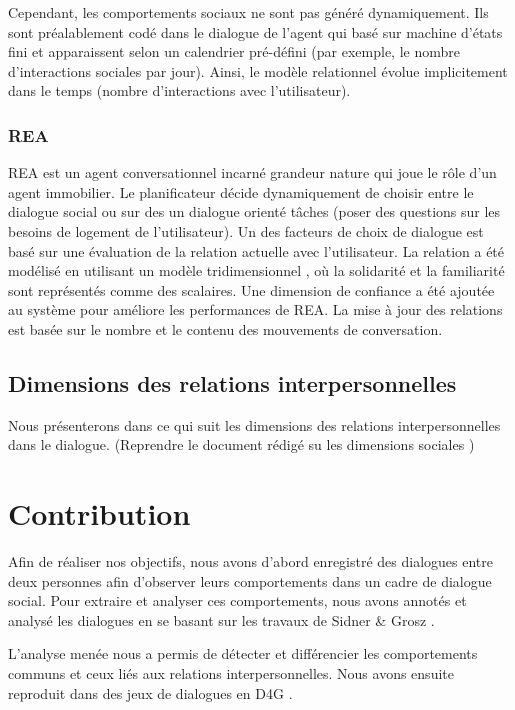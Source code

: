 \documentclass[a4paper,french]{article}
\begin{document}
\par Cependant, les comportements sociaux ne sont pas généré dynamiquement. Ils sont préalablement codé dans le dialogue de l'agent qui basé sur machine d'états fini et apparaissent selon un calendrier pré-défini (par exemple, le nombre d'interactions sociales par jour). Ainsi, le modèle relationnel évolue implicitement dans le temps (nombre d'interactions avec l'utilisateur).
\subsubsection{REA} REA \cite{bickmore2005establishing} est un agent conversationnel incarné grandeur nature qui joue le rôle d'un agent immobilier. Le planificateur décide dynamiquement  de choisir entre le dialogue social  ou sur des un dialogue orienté tâches (poser des questions sur les besoins de logement de l'utilisateur). Un des facteurs de choix de dialogue est basé sur une évaluation de la relation actuelle avec l'utilisateur. La relation a été modélisé en utilisant un modèle tridimensionnel \cite{svennevig2000getting}, où la solidarité et la familiarité sont représentés comme des scalaires. Une dimension de confiance a été ajoutée au système pour améliore les performances de REA. La  mise à jour des  relations est basée sur le nombre et le contenu des mouvements de conversation.



\subsection{ Dimensions des relations interpersonnelles}
Nous présenterons dans ce qui suit les dimensions des relations interpersonnelles dans le dialogue. 
(Reprendre le document rédigé su les dimensions sociales \cite {svennevig2000getting, haslam1994mental})


\section{Contribution}
\label{contribution}

\par Afin de réaliser nos objectifs, nous avons d'abord enregistré des dialogues entre deux personnes afin d'observer leurs comportements dans un cadre de dialogue social. 
Pour extraire et analyser ces comportements, nous avons annotés et analysé les dialogues  en se basant sur les travaux de Sidner \& Grosz \cite{grosz1986attention}. \par L'analyse menée nous a permis de détecter et différencier les comportements communs et ceux liés aux relations interpersonnelles. Nous avons ensuite reproduit dans des jeux de dialogues en D4G \cite{rich}. 
\end{document}
